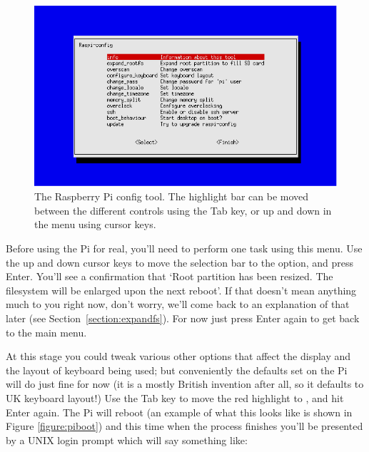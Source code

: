 \begin{figure}
\centerline{\includegraphics[width=13cm]{images/raspi-config.png}}
\caption{The Raspberry Pi config tool. The highlight bar can be moved between the different controls using the Tab key, or up and down in the menu using cursor keys.}\label{figure:raspi-config}
\end{figure}

Before using the Pi for real, you'll need to perform one task using this menu. Use the up and down cursor keys to move the selection bar to the  option, and press Enter. You'll see a confirmation that `Root partition has been resized. The filesystem will be enlarged upon the next reboot'. If that doesn't mean anything much to you right now, don't worry, we'll come back to an explanation of that later (see Section~\ref{section:expandfs}). For now just press Enter again to get back to the main menu. 

At this stage you could tweak various other options that affect the display and the layout of keyboard being used; but conveniently the defaults set on the Pi will do just fine for now (it is a mostly British invention after all, so it defaults to UK keyboard layout!) Use the Tab key to move the red highlight to , and hit Enter again. The Pi will reboot (an example of what this looks like is shown in Figure \ref{figure:piboot}) and this time when the process finishes you'll be presented by a UNIX login prompt which will say something like:

